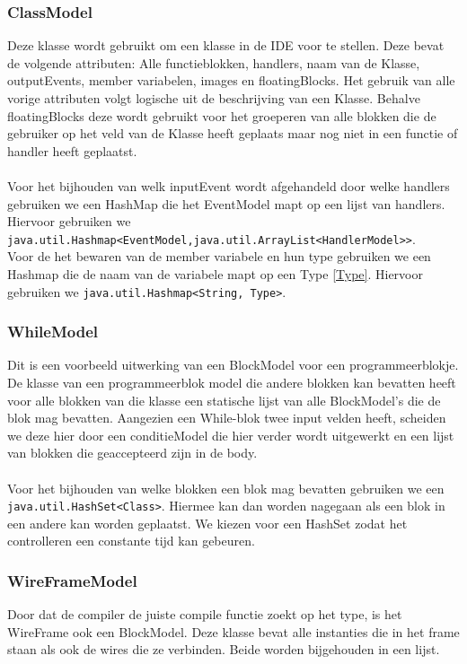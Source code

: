 \documentclass[]{article}
\begin{document}
\subsubsection{ClassModel}
Deze klasse wordt gebruikt om een klasse in de IDE voor te stellen. Deze bevat de volgende attributen: Alle functieblokken, handlers, naam van de Klasse, outputEvents, member variabelen, images en floatingBlocks. Het gebruik van alle vorige attributen volgt logische uit de beschrijving van een Klasse. Behalve floatingBlocks deze wordt gebruikt voor het groeperen van alle blokken die de gebruiker op het veld van de Klasse heeft geplaats maar nog niet in een functie of handler heeft geplaatst.\\\\
Voor het bijhouden van welk inputEvent wordt afgehandeld door welke handlers gebruiken we een HashMap die het EventModel mapt op een lijst van handlers. Hiervoor gebruiken we \\ \texttt{java.util.Hashmap<EventModel,java.util.ArrayList<HandlerModel>>}. \\ Voor de het bewaren van de member variabele en hun type gebruiken we een Hashmap die de naam van de variabele mapt op een Type \ref{Type}. Hiervoor gebruiken we \texttt{java.util.Hashmap<String, Type>}.
\subsubsection{WhileModel}
Dit is een voorbeeld uitwerking van een BlockModel voor een programmeerblokje. De klasse van een  programmeerblok model die andere blokken kan bevatten heeft voor alle blokken van die klasse een statische lijst van alle BlockModel's die de blok mag bevatten. Aangezien een While-blok twee input velden heeft, scheiden we deze hier door een conditieModel die hier verder wordt uitgewerkt en een lijst van blokken die geaccepteerd zijn in de body.\\\\
Voor het bijhouden van welke blokken een blok mag bevatten gebruiken we een \texttt{java.util.HashSet<Class>}. Hiermee kan dan worden nagegaan als een blok in een andere kan worden geplaatst. We kiezen voor een HashSet zodat het controlleren een constante tijd kan gebeuren.
\subsubsection{WireFrameModel}
Door dat de compiler de juiste compile functie zoekt op het type, is het WireFrame ook een BlockModel. Deze klasse bevat alle instanties die in het frame staan als ook de wires die ze verbinden. Beide worden bijgehouden in een lijst.
\end{document}
